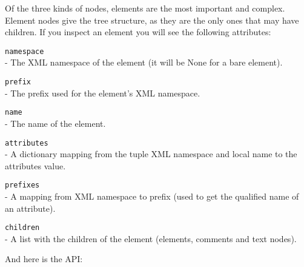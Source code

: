Of the three kinds of nodes, elements are the most important and complex.
Element nodes give the tree structure, as they are the only ones that may
have children. If you inspect an element you will see the following
attributes:

\begin{api}
    {\tt namespace}\\
    - The XML namespace of the element (it will be None for a bare element).

    {\tt prefix}\\
    - The prefix used for the element's XML namespace.

    {\tt name}\\
    - The name of the element.

    {\tt attributes}\\
    - A dictionary mapping from the tuple XML namespace and local name to
      the attributes value.

    {\tt prefixes}\\
    - A mapping from XML namespace to prefix (used to get the qualified
      name of an attribute).

    {\tt children}\\
    - A list with the children of the element (elements, comments and text
      nodes).
\end{api}


And here is the API:

